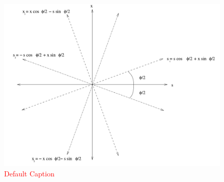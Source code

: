 \begin{figure}
\begin{center}
\includegraphics[width=\linewidth,height=\textheight,keepaspectratio]{../HourglassCorrection/figs/bunch_rotation}
\caption{ \textcolor{red}{Default Caption} }
\label{fig:bunch_rotation}
\end{center}
\end{figure}
